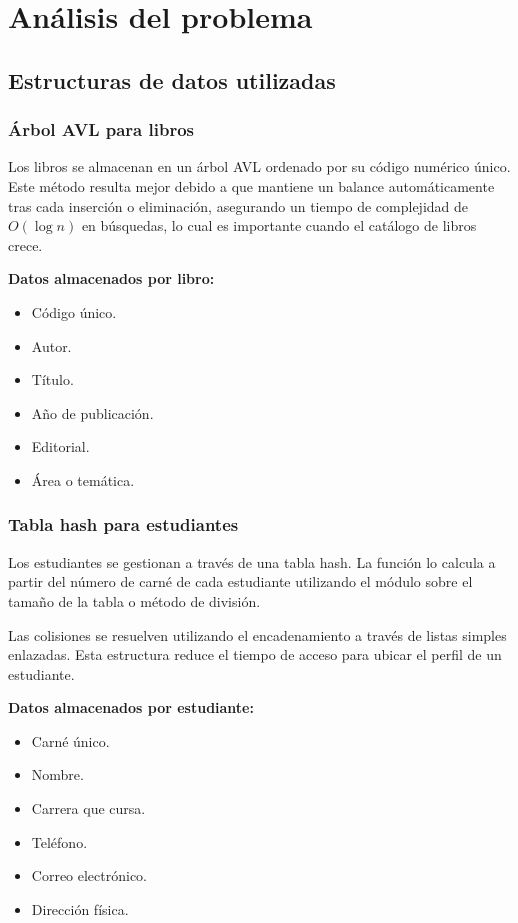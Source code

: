 \documentclass[11pt]{article}
\begin{document}
\section{Análisis del problema}

\subsection{Estructuras de datos utilizadas}

\subsubsection{Árbol AVL para libros}

Los libros se almacenan en un árbol AVL ordenado por su código numérico único. Este método resulta mejor debido a que mantiene un balance automáticamente tras cada inserción o eliminación, asegurando un tiempo de complejidad de $O(\log n)$ en búsquedas, lo cual es importante cuando el catálogo de libros crece.

\textbf{Datos almacenados por libro:}
\begin{itemize}[noitemsep]
    \item Código único.
    \item Autor.
    \item Título.
    \item Año de publicación.
    \item Editorial.
    \item Área o temática.
\end{itemize}

\subsubsection{Tabla hash para estudiantes}

Los estudiantes se gestionan a través de una tabla hash. La función lo calcula a partir del número de carné de cada estudiante utilizando el módulo sobre el tamaño de la tabla o método de división.

Las colisiones se resuelven utilizando el encadenamiento a través de listas simples enlazadas. Esta estructura reduce el tiempo de acceso para ubicar el perfil de un estudiante.

\textbf{Datos almacenados por estudiante:}
\begin{itemize}[noitemsep]
    \item Carné único.
    \item Nombre.
    \item Carrera que cursa.
    \item Teléfono.
    \item Correo electrónico.
    \item Dirección física.
\end{itemize}
\end{document}
